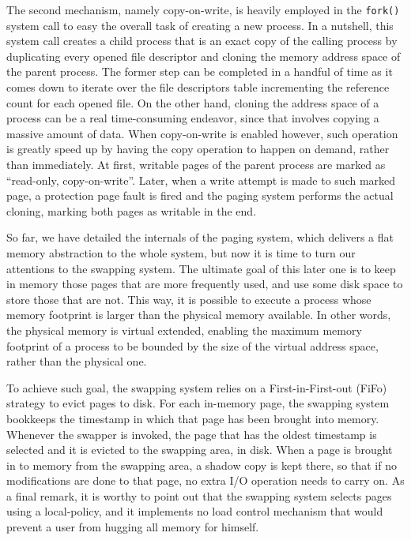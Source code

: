 \documentclass[10pt,a4paper]{article}
\begin{document}
The second mechanism, namely copy-on-write, is heavily employed in the \texttt{fork()} system call to easy the overall task of creating a new process. In a nutshell, this system call creates a child process that is an exact copy of the calling process by duplicating every opened file descriptor and cloning the memory address space of the parent process. The former step can be completed in a handful of time as it comes down to iterate over the file descriptors table incrementing the reference count for each opened file. On the other hand, cloning the address space of a process can be a real time-consuming endeavor, since that involves copying a massive amount of data. When copy-on-write is enabled however, such operation is greatly speed up by having the copy operation to happen on demand, rather than immediately. At first, writable pages of the parent process are marked as ``read-only, copy-on-write''. Later, when a write attempt is made to such marked page, a protection page fault is fired and the paging system performs the actual cloning, marking both pages as writable in the end.

So far, we have detailed the internals of the paging system, which delivers a flat memory abstraction to the whole system, but now it is time to turn our attentions to the swapping system. The ultimate goal of this later one is to keep in memory those pages that are more frequently used, and use some disk space to store those that are not. This way, it is possible to execute a process whose memory footprint is larger than the physical memory available. In other words, the physical memory is virtual extended, enabling the maximum memory footprint of a process to be bounded by the size of the virtual address space, rather than the physical one.

To achieve such goal, the swapping system relies on a First-in-First-out (FiFo) strategy to evict pages to disk. For each in-memory page, the swapping system bookkeeps the timestamp in which that page has been brought into memory. Whenever the swapper is invoked, the page that has the oldest timestamp is selected and it is evicted to the swapping area, in disk. When a page is brought in to memory from the swapping area, a shadow copy is kept there, so that if no modifications are done to that page, no extra I/O operation needs to carry on. As a final remark, it is worthy to point out that the swapping system selects pages using a local-policy, and it implements no load control mechanism that would prevent a user from hugging all memory for himself. 

\printbibliography
\end{document}
